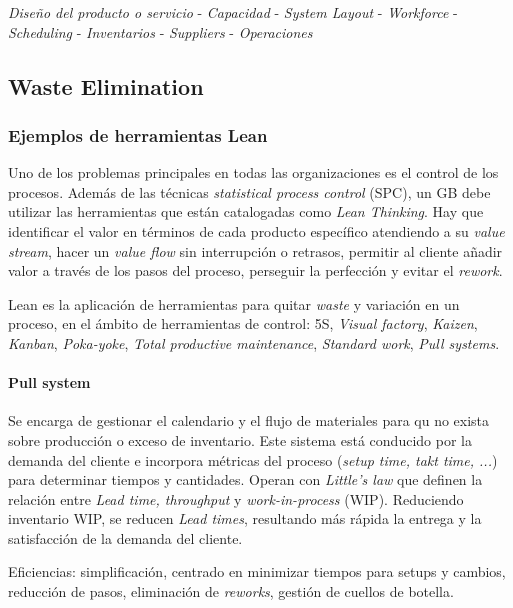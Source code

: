 \documentclass[]{article}
\begin{document}
\begin{center}
\textit{Diseño del producto o servicio} - \textit{Capacidad} - \textit{System Layout} - \textit{Workforce} - \textit{Scheduling} - \textit{Inventarios} - \textit{Suppliers} - \textit{Operaciones}
\end{center}
\subsection{Waste Elimination}
\subsubsection{Ejemplos de herramientas Lean}
Uno de los problemas principales en todas las organizaciones es el control de los procesos. Además de las técnicas \textit{statistical process control} (SPC), un GB debe utilizar las herramientas que están catalogadas como \textit{Lean Thinking}. Hay que identificar el valor en términos de cada producto específico atendiendo a su \textit{value stream}, hacer un \textit{value flow} sin interrupción o retrasos, permitir al cliente añadir valor a través de los pasos del proceso, perseguir la perfección y evitar el \textit{rework}.

Lean es la aplicación de herramientas para quitar \textit{waste} y variación en un proceso, en el ámbito de herramientas de control: 5S, \textit{Visual factory}, \textit{Kaizen}, \textit{Kanban}, \textit{Poka-yoke}, \textit{Total productive maintenance}, \textit{Standard work}, \textit{Pull systems}.

\paragraph{Pull system}

Se encarga de gestionar el calendario y el flujo de materiales para qu no exista sobre producción o exceso de inventario. Este sistema está conducido por la demanda del cliente e incorpora métricas del proceso (\textit{setup time, takt time, ...}) para determinar tiempos y cantidades. Operan con \textit{Little's law} que definen la relación entre \textit{Lead time, throughput} y \textit{work-in-process} (WIP). Reduciendo inventario WIP, se reducen \textit{Lead times}, resultando más rápida la entrega y la satisfacción de la demanda del cliente.

Eficiencias: simplificación, centrado en minimizar tiempos para setups y cambios, reducción de pasos, eliminación de \textit{reworks}, gestión de cuellos de botella.
\end{document}
